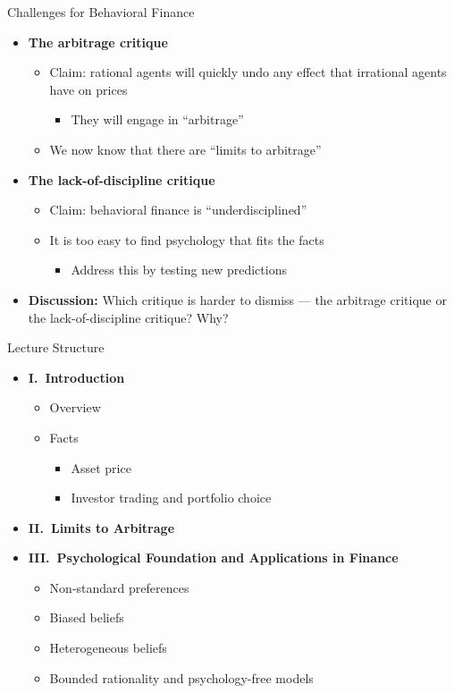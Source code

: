 \documentclass[aspectratio=169, 11pt]{beamer}
\begin{document}
\begin{frame}{Challenges for Behavioral Finance}
\begin{itemize}
\item \textbf{The arbitrage critique}
  \begin{itemize}
  \item Claim: rational agents will quickly undo any effect that irrational agents have on prices
    \begin{itemize}
    \item They will engage in ``arbitrage''
    \end{itemize}
  \item We now know that there are ``limits to arbitrage''
  \end{itemize}
\item \textbf{The lack-of-discipline critique}
  \begin{itemize}
  \item Claim: behavioral finance is ``underdisciplined''
  \item It is too easy to find psychology that fits the facts
    \begin{itemize}
    \item Address this by testing new predictions
    \end{itemize}
  \end{itemize}
\item \textbf{Discussion:} Which critique is harder to dismiss --- the arbitrage critique or the lack-of-discipline critique? Why?
\end{itemize}
\end{frame}

\begin{frame}{Lecture Structure}
\begin{itemize}
\item \textbf{I.\ Introduction}
  \begin{itemize}
  \item Overview
  \item Facts
    \begin{itemize}
    \item Asset price
    \item Investor trading and portfolio choice
    \end{itemize}
  \end{itemize}
\item \textbf{II.\ Limits to Arbitrage}
\item \textbf{III.\ Psychological Foundation and Applications in Finance}
  \begin{itemize}
  \item Non-standard preferences
  \item Biased beliefs
  \item Heterogeneous beliefs
  \item Bounded rationality and psychology-free models
  \end{itemize}
\end{itemize}
\end{frame}
\end{document}
